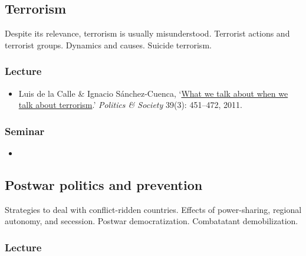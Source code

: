 \documentclass[12pt, a4paper]{article}
\begin{document}
\hline %

\subsection{Terrorism}\label{terrorism}

Despite its relevance, terrorism is usually misunderstood. Terrorist actions and terrorist groups. Dynamics and causes. Suicide terrorism.

\subsubsection*{Lecture}

\begin{itemize}
\setlength\itemsep{0pt}
\item Luis de la Calle \& Ignacio Sánchez-Cuenca, `\href{https://doi.org/10.1177/0032329211415506}{What we talk about when we talk about terrorism}.' \textit{Politics \& Society} 39(3): 451--472, 2011.
\end{itemize}

\subsubsection*{Seminar}

\begin{itemize}
\setlength\itemsep{0pt}
\item {}
\end{itemize}

\hline %

\subsection{Postwar politics and prevention}\label{postwar}

Strategies to deal with conflict-ridden countries. Effects of power-sharing, regional autonomy, and secession. Postwar democratization. Combatatant demobilization.

\subsubsection*{Lecture}
\end{document}
